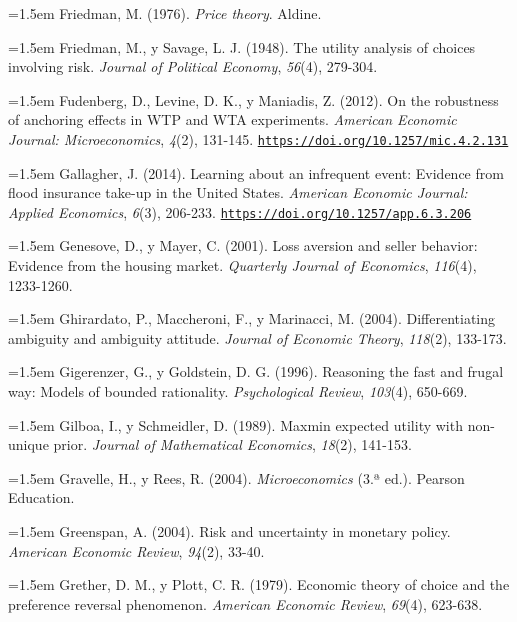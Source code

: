 \documentclass[10pt,a4paper]{article}
\begin{document}
\noindent\hangindent=1.5em Friedman, M. (1976). \textit{Price theory}. Aldine.

\noindent\hangindent=1.5em Friedman, M., y Savage, L. J. (1948). The utility analysis of choices involving risk. \textit{Journal of Political Economy}, \textit{56}(4), 279-304.

\noindent\hangindent=1.5em Fudenberg, D., Levine, D. K., y Maniadis, Z. (2012). On the robustness of anchoring effects in WTP and WTA experiments. \textit{American Economic Journal: Microeconomics}, \textit{4}(2), 131-145. \href{https://doi.org/10.1257/mic.4.2.131}{\nolinkurl{https://doi.org/10.1257/mic.4.2.131}}

\noindent\hangindent=1.5em Gallagher, J. (2014). Learning about an infrequent event: Evidence from flood insurance take-up in the United States. \textit{American Economic Journal: Applied Economics}, \textit{6}(3), 206-233. \href{https://doi.org/10.1257/app.6.3.206}{\nolinkurl{https://doi.org/10.1257/app.6.3.206}}

\noindent\hangindent=1.5em Genesove, D., y Mayer, C. (2001). Loss aversion and seller behavior: Evidence from the housing market. \textit{Quarterly Journal of Economics}, \textit{116}(4), 1233-1260.

\noindent\hangindent=1.5em Ghirardato, P., Maccheroni, F., y Marinacci, M. (2004). Differentiating ambiguity and ambiguity attitude. \textit{Journal of Economic Theory}, \textit{118}(2), 133-173.

\noindent\hangindent=1.5em Gigerenzer, G., y Goldstein, D. G. (1996). Reasoning the fast and frugal way: Models of bounded rationality. \textit{Psychological Review}, \textit{103}(4), 650-669.

\noindent\hangindent=1.5em Gilboa, I., y Schmeidler, D. (1989). Maxmin expected utility with non-unique prior. \textit{Journal of Mathematical Economics}, \textit{18}(2), 141-153.

\noindent\hangindent=1.5em Gravelle, H., y Rees, R. (2004). \textit{Microeconomics} (3.ª ed.). Pearson Education.

\noindent\hangindent=1.5em Greenspan, A. (2004). Risk and uncertainty in monetary policy. \textit{American Economic Review}, \textit{94}(2), 33-40.

\noindent\hangindent=1.5em Grether, D. M., y Plott, C. R. (1979). Economic theory of choice and the preference reversal phenomenon. \textit{American Economic Review}, \textit{69}(4), 623-638.
\end{document}

